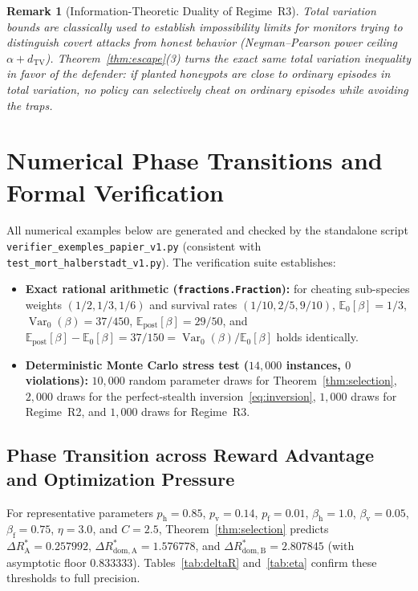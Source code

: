 \documentclass[11pt,a4paper]{article}
\newtheorem{remark}[theorem]{Remark}
\newcommand{\E}{\mathbb{E}}
\newcommand{\Var}{\operatorname{Var}}
\newcommand{\dTV}{d_{\mathrm{TV}}}
\begin{document}
\begin{remark}[Information-Theoretic Duality of Regime~R3]
Total variation bounds are classically used to establish impossibility limits for \emph{monitors} trying to distinguish covert attacks from honest behavior (Neyman--Pearson power ceiling $\alpha + \dTV$). Theorem~\ref{thm:escape}(3) turns the exact same total variation inequality in favor of the \emph{defender}: if planted honeypots are close to ordinary episodes in total variation, no policy can selectively cheat on ordinary episodes while avoiding the traps.
\end{remark}

\section{Numerical Phase Transitions and Formal Verification}

All numerical examples below are generated and checked by the standalone script \texttt{verifier\_exemples\_papier\_v1.py} (consistent with \texttt{test\_mort\_halberstadt\_v1.py}). The verification suite establishes:
\begin{itemize}
  \item \textbf{Exact rational arithmetic (\texttt{fractions.Fraction}):} for cheating sub-species weights $(1/2, 1/3, 1/6)$ and survival rates $(1/10, 2/5, 9/10)$, $\E_0[\beta] = 1/3$, $\Var_0(\beta) = 37/450$, $\E_{\mathrm{post}}[\beta] = 29/50$, and $\E_{\mathrm{post}}[\beta] - \E_0[\beta] = 37/150 = \Var_0(\beta)/\E_0[\beta]$ holds identically.
  \item \textbf{Deterministic Monte Carlo stress test ($14{,}000$ instances, $0$ violations):} $10{,}000$ random parameter draws for Theorem~\ref{thm:selection}, $2{,}000$ draws for the perfect-stealth inversion~\eqref{eq:inversion}, $1{,}000$ draws for Regime~R2, and $1{,}000$ draws for Regime~R3.
\end{itemize}

\subsection{Phase Transition across Reward Advantage and Optimization Pressure}

For representative parameters $p_{\mathrm{h}} = 0.85$, $p_{\mathrm{v}} = 0.14$, $p_{\mathrm{f}} = 0.01$, $\beta_{\mathrm{h}} = 1.0$, $\beta_{\mathrm{v}} = 0.05$, $\beta_{\mathrm{f}} = 0.75$, $\eta = 3.0$, and $C = 2.5$, Theorem~\ref{thm:selection} predicts $\Delta R_{\mathrm{A}}^* = 0.257992$, $\Delta R_{\mathrm{dom, A}}^* = 1.576778$, and $\Delta R_{\mathrm{dom, B}}^* = 2.807845$ (with asymptotic floor $0.833333$). Tables~\ref{tab:deltaR} and~\ref{tab:eta} confirm these thresholds to full precision.
\end{document}
